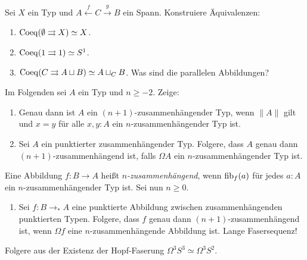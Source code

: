 \documentclass{hott-übung}
\begin{document}
\setcounter{blattnummer}{12}
\setcounter{aufgabennummer}{0}

\blatt

\aufgabe{}
Sei \(X\) ein Typ und \(A \xleftarrow{f} C \xrightarrow{g} B\) ein Spann.
Konstruiere Äquivalenzen:
\begin{enumerate}
  \item \(\mathrm{Coeq}(\emptyset \rightrightarrows X)\simeq X\).
  \item \(\mathrm{Coeq}(1 \rightrightarrows 1)\simeq S^1\).
  \item \(\mathrm{Coeq}(C \rightrightarrows A\sqcup B) \simeq A \sqcup_C B\).
  {\tiny Was sind die parallelen Abbildungen?}
\end{enumerate}

\aufgabe{}
Im Folgenden sei \(A\) ein Typ und \(n \geq -2\).
Zeige:
\begin{enumerate}
  \item
    Genau dann ist \(A\) ein \((n+1)\)-zusammenhängender Typ, wenn \(\|A\|\) gilt und \(x=y\) für alle \(x,y : A\) ein \(n\)-zusammenhängender Typ ist.
  \item
    Sei \(A\) ein punktierter zusammenhängender Typ.
    Folgere, dass \(A\) genau dann \((n+1)\)-zusammenhängend ist, falls \(\Omega A\) ein \(n\)-zusammenhängender Typ ist.
\end{enumerate}  
Eine Abbildung \(f : B \to A\) heißt \emph{\(n\)-zusammenhängend}, wenn \(\mathrm{fib}_f(a)\) für jedes \(a : A\) ein \(n\)-zusammenhängender Typ ist.
Sei nun \(n \geq 0\).
\begin{enumerate}[resume]
  \item
    Sei \(f : B \to_\ast A\) eine punktierte Abbildung zwischen zusammenhängenden punktierten Typen.
    Folgere, dass \(f\) genau dann \((n+1)\)-zusammenhängend ist, wenn \(\Omega f\) eine \(n\)-zusammenhängende Abbildung ist.
    \tiny{Lange Fasersequenz!}
\end{enumerate}


\aufgabe{}
Folgere aus der Existenz der Hopf-Faserung \(\Omega^3 S^3\simeq \Omega^3 S^2 \).
\end{document}
